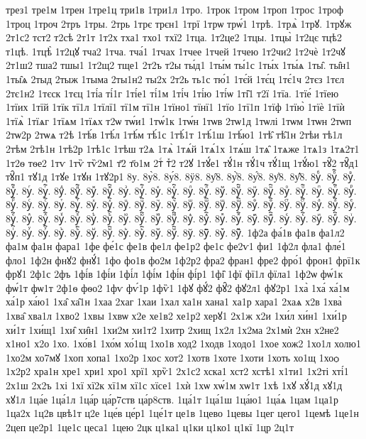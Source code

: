 {трез1
тре1м
1трен
1тре1ц
три1в
1три1л
1тро.
1трок
1тром
1троп
1трос
1троф
1троц
1троч
2тръ
1тры.
2трь
1трє
трєн1
1трї
1трѡ
трѡ́1
1трѣ.
1трѧ̀
1трꙋ.
1трꙋж
2т1с2
тст2
т2сѣ
2т1т
1т2х
тха1
тхо1
тхї2
1тца.
1т2це2
1тцы.
1тцы̀
1т2цє
тцѣ2
т1цѣ.
1тцѣ̀
1т2цꙋ
тча2
1тча.
тча́1
1тчах
1тчее
1тчей
1тчею
1т2чи2
1т2чѐ
1т2чꙋ
2т1ш2
тша2
тшы1
1т2щ2
тще1
2т2ъ
т2ы
ты́д1
1ты́м
ты́1с
1ты́х
1ты́ѧ
1ты̑.
ты̑н1
1ты̑ѧ
2тыд
2тыж
1тыма
2ты1н2
ты2х
2т2ь
ть1с
тю́1
1тє́й
1тє́ц
1тє́1ч
2тєз
1тєл
2тє1н2
1тєск
1тєц
1ті́а
ті́1г
1ті́е1
ті́1м
1ті́ч
1ті́ю
1ті́ѡ
1ті̑1
т2ї
1тїа.
1тїе́
1тїею
1тїих
1тїй
1тїк
тї1л
1тїлї1
тї1м
тї1н
1тїно1
тїнї1
1тїо
1тї1п
1тїф
1тїю̀
1тїѐ
1тїѝ
1тїѧ̀
1тїѧг
1тїѧм
1тїѧх
т2ѡ
тѡ́и1
1тѡ́1к
1тѡ́н
1тѡв
2тѡ1д
1тѡлі
1тѡм
1тѡн
2тѡп
2тѡ2р
2тѡѧ
т2ѣ
1тѣ́в
1тѣ́л
1тѣ́м
тѣ́1с
1тѣ́1т
1тѣ́1ш
1тѣ́ю1
1тѣ̑
тѣ̑1н
2тѣи
тѣ1л
2тѣм
2тѣ1н
1тѣ2р
1тѣ1с
1тѣш
т2ѧ
1тѧ̀
1тѧ́й
1тѧ́1х
1тѧ́ш
1тѧ̑
1тѧже
1тѧ1з
1тѧ2т1
1т2ѳ
тѳе2
1тѵ
1тѷ
тѷ2м1
т҃2
т҃о1м
2тⷭ
тⷯ2
т2ꙋ
1тꙋ́е1
тꙋ́1н
тꙋ́1ч
тꙋ́1щ
1тꙋ́ю1
тꙋ̑2
тꙋ̑д1
тꙋ̑п1
тꙋ1д
1тꙋе
1тꙋн
1тꙋ2р1
8у.
8у̀8.
8у́8.
8ӱ8.
8у̑8.
8у҆̀8.
8у҆́8.
8у҆̈8.
8у҆̑8.
8уⷠ.
8уⷠ҇.
8уⷡ.
8уⷡ҇.
8уⷢ.
8уⷢ҇.
8уⷣ.
8уⷣ҇.
8уⷤ.
8уⷤ҇.
8уⷥ.
8уⷥ҇.
8уⷦ.
8уⷦ҇.
8уⷧ.
8уⷧ҇.
8уⷨ.
8уⷨ҇.
8уⷩ.
8уⷩ҇.
8уⷪ.
8уⷪ҇.
8уⷫ.
8уⷫ҇.
8уⷬ.
8уⷬ҇.
8уⷭ.
8уⷭ҇.
8уⷮ.
8уⷮ҇.
8уⷯ.
8уⷯ҇.
8уⷰ.
8уⷰ҇.
8уⷱ.
8уⷱ҇.
8уⷲ.
8уⷲ҇.
8уⷳ.
8уⷳ҇.
8уⷴ.
8уⷴ҇.
8уⷵ.
8уⷵ҇.
8уⷶ.
8уⷶ҇.
8уⷷ.
8уⷷ҇.
8уⷸ.
8уⷸ҇.
8уⷹ.
8уⷹ҇.
8уⷺ.
8уⷺ҇.
8уⷻ.
8уⷻ҇.
8уⷼ.
8уⷼ҇.
8уⷽ.
8уⷽ҇.
8уⷾ.
8уⷾ҇.
8уⷿ.
8уⷿ҇.
8уꙴ.
8уꙴ҇.
8уꙵ.
8уꙵ҇.
8уꙶ.
8уꙶ҇.
8уꙷ.
8уꙷ҇.
8уꙸ.
8уꙸ҇.
8уꙹ.
8уꙹ҇.
8уꙺ.
8уꙺ҇.
8уꙻ.
8уꙻ҇.
8у꙼.
8у꙼҇.
8у꙽.
8у꙽҇.
1ф2а
фа́1в
фа1в
фа1л2
фа1м
фа1н
фара1
1фе
фе́1с
фе1в
фе1л
фе1р2
фе1с
фе2ѵ1
фи1
1ф2л
фла1
фле́1
фло1
1ф2н
фнꙋ2
фнꙋ́1
1фо
фо1в
фо2м
1ф2р2
фра2
фран1
фре2
фро́1
фрон1
фрї1к
фрꙋ1
2ф1с
2фъ
1фі́в
1фі́и
1фі́л
1фі́м
1фі́н
фі́р1
1фі̑
1фї
фї1л
фїла1
1ф2ѡ
фѡ́1к
фѡ́1т
фѡ1т
2ф1ѳ
фѳо2
1фѵ
фѵ́1р
1фѷ1
1фꙋ
фꙋ́2
фꙋ̑2
фꙋ2л1
фꙋ2р1
1ха̀
1ха́
ха́1м
ха́1р
ха́ю1
1ха̑
ха̑1н
1хаа
2хаг
1хаи
1хал
ха1н
хана1
ха1р
хара1
2хаѧ
х2в
1хва̀
1хва̑
хва1л
1хво2
1хвы
1хвѡ
х2е
хе1в2
хе1р2
херꙋ1
2х1ж
х2и
1хи́л
хи́н1
1хи́1р
хи́1т
1хи́щ1
1хи̑
хи̑н1
1хи2м
хи1т2
1хитр
2хищ
1х2л
1х2ма
2х1мѝ
2хн
х2не2
х1но1
х2о
1хо.
1хо́в1
1хо́м
хо́1щ
1хо1в
ход2
1ходв
1ходо1
1хое
хож2
1хо1л
холю1
1хо2м
хо7мꙋ
1хоп
хопа1
1хо2р
1хос
хот2
1хотв
1хоте
1хоти
1хоть
хо1щ
1хоѻ
1х2р2
хра1н
хре1
хри1
хро1
хрї1
хрѷ1
2х1с2
хска1
хст2
хстѣ1
х1ти1
1х2ті
хті́1
2х1ш
2х2ъ
1хі
1хї
хї2к
хї1м
хї1с
хїсе1
1хѝ
1хѡ
хѡ́1м
хѡ1т
1хѣ
1хꙋ
хꙋ́1д
хꙋ1д
хꙋ1л
1ца́е
1ца́1л
1ца́р
ца́р7ств
ца́р8ств.
1ца́1т
1ца́1ш
1ца́ю1
1ца́ѧ
1цам
1ца1р
1ца2х
1ц2в
цвѣ1т
ц2е
1це́в
це́р1
1це́1т
це1в
1цево
1цевы
1цег
цего1
1цемѣ
1це1н
2цеп
це2р1
1це1с
цеса1
1цею
2цк
ц1ка1
ц1ки
ц1ко1
ц1кї
1цр
2ц1т
}
